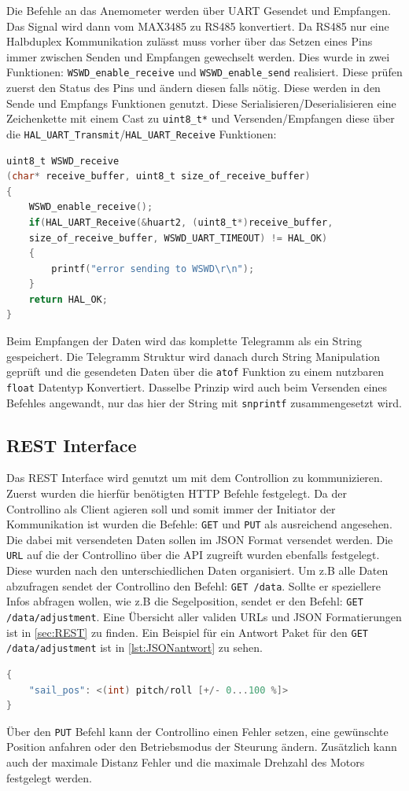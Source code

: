 \noindent Die Befehle an das Anemometer werden über \ac{UART} Gesendet und Empfangen. Das Signal wird dann vom MAX3485 zu RS485 konvertiert. Da RS485 nur eine Halbduplex Kommunikation zulässt muss vorher über das Setzen eines Pins immer zwischen Senden und Empfangen gewechselt werden. Dies wurde in zwei Funktionen: \verb|WSWD_enable_receive| und \verb|WSWD_enable_send| realisiert. Diese prüfen zuerst den Status des Pins und ändern diesen falls nötig. Diese werden in den Sende und Empfangs Funktionen genutzt. Diese Serialisieren/Deserialisieren eine Zeichenkette mit einem Cast zu \verb|uint8_t*| und Versenden/Empfangen diese über die \verb|HAL_UART_Transmit|/\verb|HAL_UART_Receive| Funktionen:
\begin{lstlisting}[language=C, caption={Empfangen einer Nachricht vom WSWD}, label={lst:WSWDreceive}]
uint8_t WSWD_receive
(char* receive_buffer, uint8_t size_of_receive_buffer)
{
	WSWD_enable_receive();
	if(HAL_UART_Receive(&huart2, (uint8_t*)receive_buffer, 
	size_of_receive_buffer, WSWD_UART_TIMEOUT) != HAL_OK)
	{
		printf("error sending to WSWD\r\n");
	}
	return HAL_OK;
}
\end{lstlisting}
Beim Empfangen der Daten wird das komplette Telegramm als ein String gespeichert. Die Telegramm Struktur wird danach durch String Manipulation geprüft und die gesendeten Daten über die \verb|atof| Funktion zu einem nutzbaren \verb|float| Datentyp Konvertiert. Dasselbe Prinzip wird auch beim Versenden eines Befehles angewandt, nur das hier der String mit \verb|snprintf| zusammengesetzt wird.\\
\subsection{\ac{REST} Interface}
Das \ac{REST} Interface wird genutzt um mit dem Controllion zu kommunizieren. Zuerst wurden die hierfür benötigten \ac{HTTP} Befehle festgelegt. Da der Controllino als Client agieren soll und somit immer der Initiator der Kommunikation ist wurden die Befehle: \verb|GET| und \verb|PUT| als ausreichend angesehen. Die dabei mit versendeten Daten sollen im \ac{JSON} Format versendet werden. Die \verb|URL| auf die der Controllino über die \ac{API} zugreift wurden ebenfalls festgelegt. Diese wurden nach den unterschiedlichen Daten organisiert. Um z.B alle Daten abzufragen sendet der Controllino den Befehl: \verb|GET /data|. Sollte er speziellere Infos abfragen wollen, wie z.B die Segelposition, sendet er den Befehl: \verb|GET /data/adjustment|. Eine Übersicht aller validen \ac{URL}s und JSON Formatierungen ist in \autoref{sec:REST} zu finden. Ein Beispiel für ein Antwort Paket für den \verb|GET /data/adjustment| ist in \autoref{lst:JSONantwort} zu sehen.
\begin{lstlisting}[language=C, caption={GET /data/adjustment Antwort Paket}, label={lst:JSONantwort}]
{
	"sail_pos": <(int) pitch/roll [+/- 0...100 %]>
}
\end{lstlisting}
Über den \verb|PUT| Befehl kann der Controllino einen Fehler setzen, eine gewünschte Position anfahren oder den Betriebsmodus der Steurung ändern. Zusätzlich kann auch der maximale Distanz Fehler und die maximale Drehzahl des Motors festgelegt werden.\\


